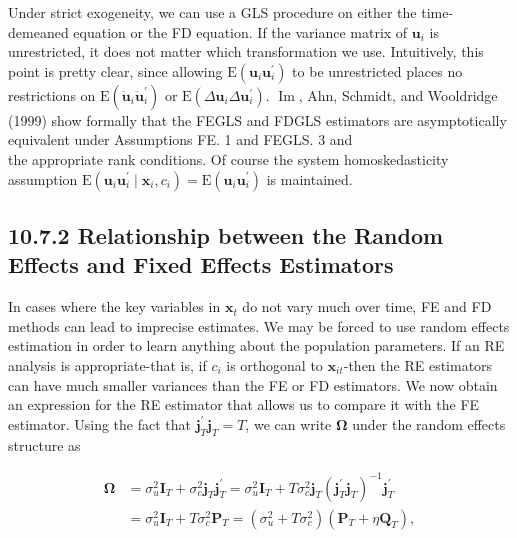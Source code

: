 \documentclass[10pt]{article}
\begin{document}
Under strict exogeneity, we can use a GLS procedure on either the time-demeaned equation or the FD equation. If the variance matrix of $\mathbf{u}_{i}$ is unrestricted, it does not matter which transformation we use. Intuitively, this point is pretty clear, since allowing $\mathrm{E}\left(\mathbf{u}_{i} \mathbf{u}_{i}^{\prime}\right)$ to be unrestricted places no restrictions on $\mathrm{E}\left(\ddot{\mathbf{u}}_{i} \ddot{\mathbf{u}}_{i}^{\prime}\right)$ or $\mathrm{E}\left(\Delta \mathbf{u}_{i} \Delta \mathbf{u}_{i}^{\prime}\right)$. $\operatorname{Im}$, Ahn, Schmidt, and Wooldridge (1999) show formally that the FEGLS and FDGLS estimators are asymptotically equivalent under Assumptions FE. 1 and FEGLS. 3 and\\
the appropriate rank conditions. Of course the system homoskedasticity assumption $\mathrm{E}\left(\mathbf{u}_{i} \mathbf{u}_{i}^{\prime} \mid \mathbf{x}_{i}, c_{i}\right)=\mathrm{E}\left(\mathbf{u}_{i} \mathbf{u}_{i}^{\prime}\right)$ is maintained.

\subsection*{10.7.2 Relationship between the Random Effects and Fixed Effects Estimators}
In cases where the key variables in $\mathbf{x}_{t}$ do not vary much over time, FE and FD methods can lead to imprecise estimates. We may be forced to use random effects estimation in order to learn anything about the population parameters. If an RE analysis is appropriate-that is, if $c_{i}$ is orthogonal to $\mathbf{x}_{i t}$-then the RE estimators can have much smaller variances than the FE or FD estimators. We now obtain an expression for the RE estimator that allows us to compare it with the FE estimator. Using the fact that $\mathbf{j}_{T}^{\prime} \mathbf{j}_{T}=T$, we can write $\boldsymbol{\Omega}$ under the random effects structure as

$$
\begin{aligned}
\boldsymbol{\Omega} & =\sigma_{u}^{2} \mathbf{I}_{T}+\sigma_{c}^{2} \mathbf{j}_{T} \mathbf{j}_{T}^{\prime}=\sigma_{u}^{2} \mathbf{I}_{T}+T \sigma_{c}^{2} \mathbf{j}_{T}\left(\mathbf{j}_{T}^{\prime} \mathbf{j}_{T}\right)^{-1} \mathbf{j}_{T}^{\prime} \\
& =\sigma_{u}^{2} \mathbf{I}_{T}+T \sigma_{c}^{2} \mathbf{P}_{T}=\left(\sigma_{u}^{2}+T \sigma_{c}^{2}\right)\left(\mathbf{P}_{T}+\eta \mathbf{Q}_{T}\right),
\end{aligned}
$$
\end{document}
